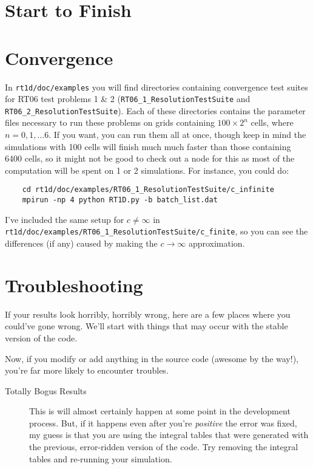 \documentclass[letterpaper,titlepage,12pt]{article}
\numberwithin{equation}{section}
\begin{document}
\section{Start to Finish}

\section{Convergence}
In \texttt{rt1d/doc/examples} you will find directories containing convergence test suites for RT06 test problems 1 \& 2 (\texttt{RT06\_1\_ResolutionTestSuite} and \texttt{RT06\_2\_ResolutionTestSuite}).  Each of these directories contains the parameter files necessary to run these problems on grids containing $100 \times 2^n$ cells, where $n = 0,1,...6$.  If you want, you can run them all at once, though keep in mind the simulations with 100 cells will finish much much faster than those containing 6400 cells, so it might not be good to check out a node for this as most of the computation will be spent on 1 or 2 simulations.  For instance, you could do:
\begin{verbatim}
    cd rt1d/doc/examples/RT06_1_ResolutionTestSuite/c_infinite
    mpirun -np 4 python RT1D.py -b batch_list.dat
\end{verbatim}
I've included the same setup for $c \neq \infty$ in \texttt{rt1d/doc/examples/RT06\_1\_ResolutionTestSuite/c\_finite}, so you can see the differences (if any) caused by making the $c \rightarrow \infty$ approximation.

\section{Troubleshooting}
If your results look horribly, horribly wrong, here are a few places where you could've gone wrong.  We'll start with things that may occur with the stable version of the code.


Now, if you modify or add anything in the source code (awesome by the way!), you're far more likely to encounter troubles.


\begin{description}
    \item[Totally Bogus Results] This is will almost certainly happen at some point in the development process. But, if it happens even after you're \textit{positive} the error was fixed, my guess is that you are using the integral tables that were generated with the previous, error-ridden version of the code.  Try removing the integral tables and re-running your simulation.
\end{description}


\newpage


\end{document}
